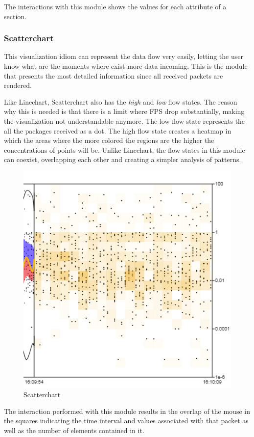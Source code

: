 \documentclass[letterpaper, 10 pt, conference]{ieeeconf}  %
\begin{document}
The interactions with this module shows the values for each attribute of a section.

\subsubsection{Scatterchart}
\label{subsubsection:scatterchart}
This visualization idiom can represent the data flow very easily, letting the user know what are the moments where exist more data incoming. This is the module that presents the most detailed information since all received packets are rendered. 

Like Linechart, Scatterchart also has the \textit{high} and \textit{low} flow states. The reason why this is needed is that there is a limit where FPS drop substantially, making the visualization not understandable anymore. The low flow state represents the all the packages received as a dot. The high flow state creates a heatmap in which the areas where the more colored the regions are the higher the concentrations of points will be. Unlike Linechart, the flow states in this module can coexist, overlapping each other and creating a simpler analysis of patterns.


\begin{figure}[ht]
    \centering
    \includegraphics[width=0.8\linewidth]{Figures/scatterchart.png}
    \caption{Scatterchart}
        \label{fig:scatterchart}
\end{figure}

The interaction performed with this module results in the overlap of the mouse in the squares indicating the time interval and values associated with that packet as well as the number of elements contained in it.
\end{document}
